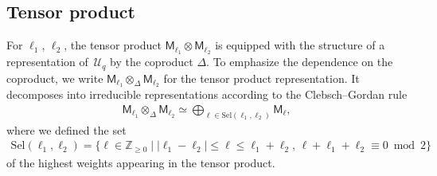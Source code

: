 \documentclass[pdftex]{sigma}
\numberwithin{equation}{section}
\newcommand{\bZ}{\mathbb{Z}}
\newcommand{\cU}{\mathcal{U}}
\newcommand{\sfM}{\mathsf{M}}
\newcommand{\UEA}{\cU}
\newcommand{\Uq}{\UEA_{q}}
\newcommand{\QGirrep}[1]{\sfM_{#1}}
\newcommand{\QGcoprod}{\Delta}
\newcommand{\Sel}{\mathrm{Sel}}
\begin{document}
\subsection{Tensor product}
For $\ell_{1}$, $\ell_{2}$, the tensor product $\QGirrep{\ell_{1}}\otimes \QGirrep{\ell_{2}}$ is equipped with the structure of a representation of~$\Uq$ by the coproduct $\QGcoprod$.
To emphasize the dependence on the coproduct, we write $\QGirrep{\ell_{1}}\otimes_{\QGcoprod}\QGirrep{\ell_{2}}$ for the tensor product representation.
It decomposes into irreducible representations according to the Clebsch--Gordan rule
\begin{gather}
\label{eq:QG_CGrule}
 \QGirrep{\ell_{1}}\otimes_{\QGcoprod} \QGirrep{\ell_{2}}\simeq \bigoplus_{\ell\in\Sel (\ell_{1},\ell_{2})}\QGirrep{\ell},
\end{gather}
where we defined the set
\begin{gather*}
 \Sel (\ell_{1},\ell_{2})= \{\ell\in \bZ_{\geq 0}\mid |\ell_{1}-\ell_{2}|\leq \ell \leq \ell_{1}+\ell_{2},\, \ell+\ell_{1}+\ell_{2}\equiv 0 \bmod 2 \}
\end{gather*}
of the highest weights appearing in the tensor product.
\end{document}
